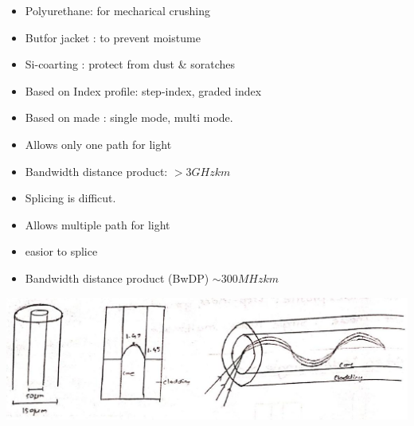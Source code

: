 \documentclass[12pt, a4paper]{article}
\begin{document}

\begin{itemize}
	\item Polyurethane: for mecharical crushing
	\item Butfor jacket : to prevent moistume
	\item Si-coarting : protect from dust \& soratches
\end{itemize}


\begin{itemize}
	\item Based on Index profile: step-index, graded index
	\item Based on made : single mode, multi mode.
\end{itemize}




\begin{itemize}
	\item Allows only one path for light
	\item Bandwidth distance product: $>3 \unit{GHzkm}$
	\item Splicing is difficut.
\end{itemize}




\begin{itemize}
	\item Allows multiple path for light
	\item easior to splice
	\item Bandwidth distance product (BwDP) $\sim 300 \unit{MHz km}$
\end{itemize}


\begin{center}
	\includegraphics[max width=\textwidth]{2024_06_16_30d750483617f1939202g-06(3)}
\end{center}
\end{document}

